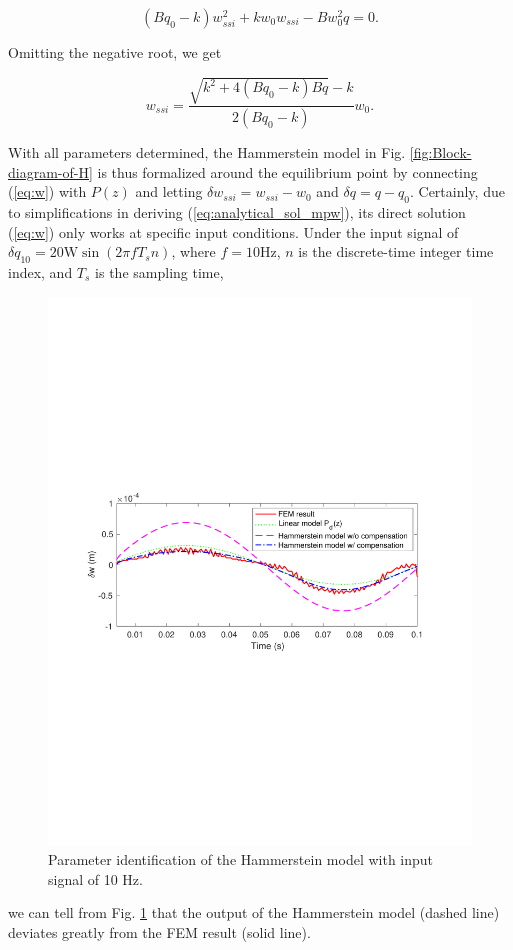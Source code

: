 \documentclass [11pt, proquest] {uwthesis}[2020/02/24]
\begin{document}
\noindent 
\begin{equation}
(Bq_{0}-k)w_{ssi}^{2}+kw_{0}w_{ssi}-Bw_{0}^{2}q=0.\label{eq:w_0}
\end{equation}

\noindent Omitting the negative root, we get

\noindent 
\begin{equation}
w_{ssi}=\frac{\sqrt{k^{2}+4(Bq_{0}-k)Bq}-k}{2(Bq_{0}-k)}w_{0}.\label{eq:w}
\end{equation}

With all parameters determined, the Hammerstein model in Fig. \ref{fig:Block-diagram-of-H}
is thus formalized around the equilibrium point by connecting (\ref{eq:w})
with $P(z)$ and letting $\delta w_{ssi}=w_{ssi}-w_{0}$ and $\delta q=q-q_{0}$.
Certainly, due to simplifications in deriving (\ref{eq:analytical_sol_mpw}),
its direct solution (\ref{eq:w}) only works at specific input conditions.
Under the input signal of $\delta q_{10}=20\text{W}\sin(2\pi fT_{s}n)$,
where $f=10\text{Hz}$, $n$ is the discrete-time integer time index, and $T_{s}$ is the sampling time, 
\begin{figure}[!ht]
\begin{centering}
\includegraphics[clip,width=13cm]{Hammerstein/parameterID}
\par\end{centering}
\centering{}\caption{\label{fig:Parameter-identification-of}Parameter identification of
the Hammerstein model with input signal of 10 Hz.}
\end{figure}
we can tell from Fig. \ref{fig:Parameter-identification-of} that
the output of the Hammerstein model (dashed line) deviates greatly
from the FEM result (solid line).
\end{document}
